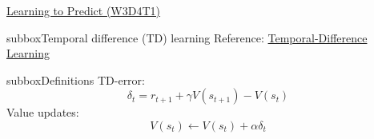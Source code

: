 \begin{textbox}{\href{https://compneuro.neuromatch.io/tutorials/W3D4_ReinforcementLearning/student/W3D4_Tutorial1.html}{Learning to Predict (W3D4T1)} }
\begin{subbox}{subbox}{Temporal difference (TD) learning}
Reference: \href{https://web.stanford.edu/group/pdplab/pdphandbook/handbookch10.html}{Temporal-Difference Learning}


\end{subbox}
\begin{subbox}{subbox}{Definitions}
\scriptsize
TD-error:
\begin{equation}
\delta_{t} = r_{t+1} + \gamma V(s_{t+1}) - V(s_{t})
\end{equation}
Value updates:
\begin{equation}
V(s_{t}) \leftarrow V(s_{t}) + \alpha \delta_{t}
\end{equation}

\end{subbox}
\end{textbox}
